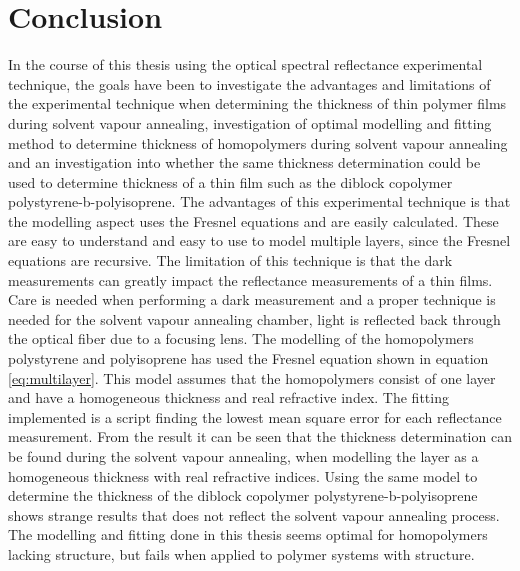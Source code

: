 \documentclass[MasterThesisMain.tex]{subfiles}
\begin{document}
\chapter{Conclusion} \label{ch:conclusion}
In the course of this thesis using the optical spectral reflectance experimental technique, the goals have been to investigate the advantages and limitations of the experimental technique when determining the thickness of thin polymer films during solvent vapour annealing, investigation of optimal modelling and fitting method to determine thickness of homopolymers during solvent vapour annealing and an investigation into whether the same thickness determination could be used to determine thickness of a thin film such as the diblock copolymer polystyrene-b-polyisoprene. The advantages of this experimental technique is that the modelling aspect uses the Fresnel equations and are easily calculated. These are easy to understand and easy to use to model multiple layers, since the Fresnel equations are recursive. The limitation of this technique is that the dark measurements can greatly impact the reflectance measurements of a thin films. Care is needed when performing a dark measurement and a proper technique is needed for the solvent vapour annealing chamber, light is reflected back through the optical fiber due to a focusing lens. The modelling of the homopolymers polystyrene and polyisoprene has used the Fresnel equation shown in equation \ref{eq:multilayer}. This model assumes that the homopolymers consist of one layer and have a homogeneous thickness and real refractive index. The fitting implemented is a script finding the lowest mean square error for each reflectance measurement. From the result it can be seen that the thickness determination can be found during the solvent vapour annealing, when modelling the layer as a homogeneous thickness with real refractive indices. Using the same model to determine the thickness of the diblock copolymer polystyrene-b-polyisoprene shows strange results that does not reflect the solvent vapour annealing process. The modelling and fitting done in this thesis seems optimal for homopolymers lacking structure, but fails when applied to polymer systems with structure.     
\end{document}
